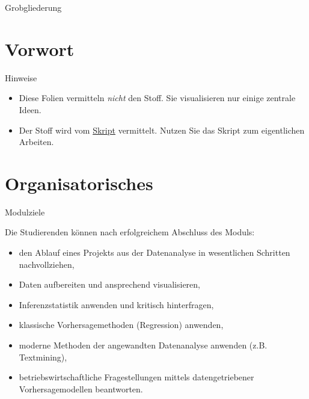 \begin{frame}{Grobgliederung}

\tableofcontents

\end{frame}

\section{Vorwort}\label{vorwort}

\begin{frame}{Hinweise}

\begin{itemize}
\item
  Diese Folien vermitteln \emph{nicht} den Stoff. Sie visualisieren nur
  einige zentrale Ideen.
\item
  Der Stoff wird vom
  \href{https://sebastiansauer.github.io/Praxis_der_Datenanalyse/}{Skript}
  vermittelt. Nutzen Sie das Skript zum eigentlichen Arbeiten.
\end{itemize}

\end{frame}

\section{Organisatorisches}\label{organisatorisches}

\begin{frame}{Modulziele}

Die Studierenden können nach erfolgreichem Abschluss des Moduls:

\begin{itemize}
\tightlist
\item
  den Ablauf eines Projekts aus der Datenanalyse in wesentlichen
  Schritten nachvollziehen,
\item
  Daten aufbereiten und ansprechend visualisieren,
\item
  Inferenzstatistik anwenden und kritisch hinterfragen,
\item
  klassische Vorhersagemethoden (Regression) anwenden,
\item
  moderne Methoden der angewandten Datenanalyse anwenden (z.B.
  Textmining),
\item
  betriebswirtschaftliche Fragestellungen mittels datengetriebener
  Vorhersagemodellen beantworten.
\end{itemize}

\end{frame}

